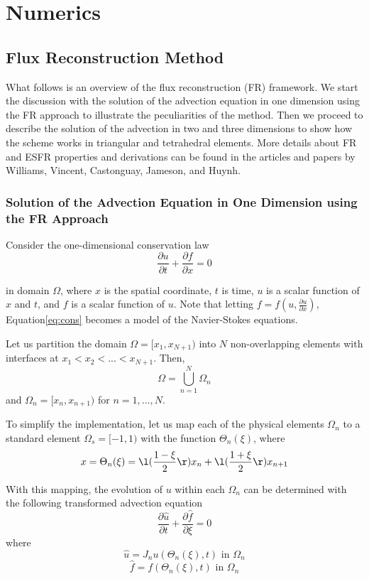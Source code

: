 \section{Numerics}
\label{sec:numerics}
\subsection{Flux Reconstruction Method}

What follows is an overview of the flux reconstruction (FR) framework. We start the discussion with the solution of the advection equation in one dimension using the FR approach to illustrate the peculiarities of the method. Then we proceed to describe the solution of the advection in two and three dimensions to show how the scheme works in triangular and tetrahedral elements. 
More details about FR and ESFR properties and derivations can be found in the articles and papers by Williams, Vincent, Castonguay, Jameson, and Huynh.

\subsubsection{Solution of the Advection Equation in One Dimension using the FR Approach}

Consider the one-dimensional conservation law
\begin{equation}
\label{eq:cons}
\frac{\partial u}{\partial t} + \frac{\partial f}{\partial x} = 0
\end{equation}

in domain $\Omega$, where $x$ is the spatial coordinate, $t$ is time, $u$ is a scalar function of $x$ and $t$, and $f$ is a scalar function of $u$. Note that letting $f = f(u,\frac{\partial u}{\partial x})$, Equation\ref{eq:cons} becomes a model of the Navier-Stokes equations.

Let us partition the domain $\Omega = [x_1,x_{N+1})$ into $N$ non-overlapping elements with 
interfaces at $x_1<x_2<...<x_{N+1}$. Then,
$$
\Omega = \bigcup^N_{n=1} \Omega_n
$$
and $\Omega_n = [x_n,x_{n+1})$ for $n = 1,...,N$.

To simplify the implementation, let us map each of the physical elements $\Omega_n$ to a standard 
element $\Omega_s=[-1,1)$ with the function $\Theta_n(\xi)$, where
$$
x = \Theta_n(\xi) = \l( \frac{1-\xi}{2} \r) x_n + \l(\frac{1+\xi}{2}\r) x_{n+1} 
$$

With this mapping, the evolution of $u$ within each $\Omega_n$ can be determined with the following 
transformed advection equation
$$
\frac{\partial \hat{u}}{\partial t} + \frac{\partial \hat{f}}{\partial \xi} = 0
$$
where
$$
\hat{u} = J_n u(\Theta_n(\xi),t) \text{ in } \Omega_n
$$
$$
\hat{f} = f(\Theta_n(\xi),t) \text{ in } \Omega_n
$$


